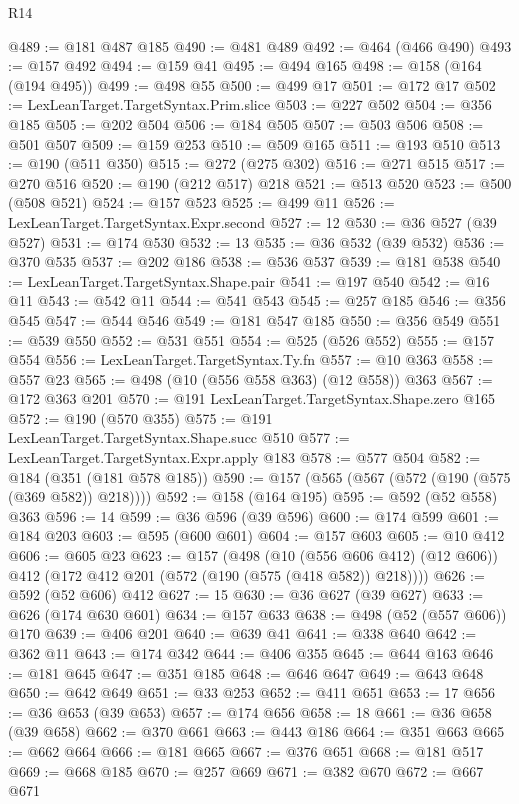 \begin{lexlean}{R14}
\begin{coremodule}
@489 := @181 @487 @185
@490 := @481 @489
@492 := @464 (@466 @490)
@493 := @157 @492
@494 := @159 @41
@495 := @494 @165
@498 := @158 (@164 (@194 @495))
@499 := @498 @55
@500 := @499 @17
@501 := @172 @17
@502 := LexLeanTarget.TargetSyntax.Prim.slice
@503 := @227 @502
@504 := @356 @185
@505 := @202 @504
@506 := @184 @505
@507 := @503 @506
@508 := @501 @507
@509 := @159 @253
@510 := @509 @165
@511 := @193 @510
@513 := @190 (@511 @350)
@515 := @272 (@275 @302)
@516 := @271 @515
@517 := @270 @516
@520 := @190 (@212 @517) @218
@521 := @513 @520
@523 := @500 (@508 @521)
@524 := @157 @523
@525 := @499 @11
@526 := LexLeanTarget.TargetSyntax.Expr.second
@527 := 12
@530 := @36 @527 (@39 @527)
@531 := @174 @530
@532 := 13
@535 := @36 @532 (@39 @532)
@536 := @370 @535
@537 := @202 @186
@538 := @536 @537
@539 := @181 @538
@540 := LexLeanTarget.TargetSyntax.Shape.pair
@541 := @197 @540
@542 := @16 @11
@543 := @542 @11
@544 := @541 @543
@545 := @257 @185
@546 := @356 @545
@547 := @544 @546
@549 := @181 @547 @185
@550 := @356 @549
@551 := @539 @550
@552 := @531 @551
@554 := @525 (@526 @552)
@555 := @157 @554
@556 := LexLeanTarget.TargetSyntax.Ty.fn
@557 := @10 @363
@558 := @557 @23
@565 := @498 (@10 (@556 @558 @363) (@12 @558)) @363
@567 := @172 @363 @201
@570 := @191 LexLeanTarget.TargetSyntax.Shape.zero @165
@572 := @190 (@570 @355)
@575 := @191 LexLeanTarget.TargetSyntax.Shape.succ @510
@577 := LexLeanTarget.TargetSyntax.Expr.apply @183
@578 := @577 @504
@582 := @184 (@351 (@181 @578 @185))
@590 := @157 (@565 (@567 (@572 (@190 (@575 (@369 @582)) @218))))
@592 := @158 (@164 @195)
@595 := @592 (@52 @558) @363
@596 := 14
@599 := @36 @596 (@39 @596)
@600 := @174 @599
@601 := @184 @203
@603 := @595 (@600 @601)
@604 := @157 @603
@605 := @10 @412
@606 := @605 @23
@623 := @157
    (@498
      (@10 (@556 @606 @412) (@12 @606))
      @412
      (@172 @412 @201 (@572 (@190 (@575 (@418 @582)) @218))))
@626 := @592 (@52 @606) @412
@627 := 15
@630 := @36 @627 (@39 @627)
@633 := @626 (@174 @630 @601)
@634 := @157 @633
@638 := @498 (@52 (@557 @606)) @170
@639 := @406 @201
@640 := @639 @41
@641 := @338 @640
@642 := @362 @11
@643 := @174 @342
@644 := @406 @355
@645 := @644 @163
@646 := @181 @645
@647 := @351 @185
@648 := @646 @647
@649 := @643 @648
@650 := @642 @649
@651 := @33 @253
@652 := @411 @651
@653 := 17
@656 := @36 @653 (@39 @653)
@657 := @174 @656
@658 := 18
@661 := @36 @658 (@39 @658)
@662 := @370 @661
@663 := @443 @186
@664 := @351 @663
@665 := @662 @664
@666 := @181 @665
@667 := @376 @651
@668 := @181 @517
@669 := @668 @185
@670 := @257 @669
@671 := @382 @670
@672 := @667 @671

\end{coremodule}
\end{lexlean}
